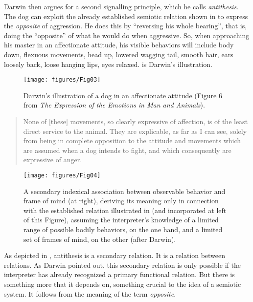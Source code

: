 Darwin then argues for a second signalling principle, which he calls \textit{antithesis}. The dog can exploit the already established semiotic 
relation shown in  to express the \textit{opposite} 
of aggression. He does this by ``reversing his whole bearing'', that is, doing the 
``opposite'' of what he would do when aggressive. So, when approaching 
his master in an affectionate attitude, his visible behaviors will include body 
down, flexuous movements, head up, lowered wagging tail, smooth hair, 
ears loosely back, loose hanging lips, eyes relaxed.  is 
Darwin's illustration.


\begin{figure}[h]
\texttt{[image: figures/Fig03]}
\caption{Darwin's illustration of a dog in an affectionate attitude 
(Figure 6 from \textit{The Expression of the Emotions in Man and 
Animals}).}
\label{darwin2}
\end{figure}




\begin{quotation}
None of $[$these$]$ movements, so clearly expressive of 
affection, is of the least direct service to the animal. They are 
explicable, as far as I can see, solely from being in complete 
opposition to the attitude and movements which are assumed when a dog 
intends to fight, and which consequently are expressive of anger. 
\citep[15--16]{darwin_expression_1872} 
\end{quotation}


\begin{figure}[h]
\texttt{[image: figures/Fig04]}
\caption{A secondary indexical association between observable behavior 
and frame of mind (at right), deriving its meaning only in connection 
with the established relation illustrated in  (and incorporated 
at left of this Figure), assuming the interpreter's knowledge of a 
limited range of possible bodily behaviors, on the one hand, and a 
limited set of frames of mind, on the other (after Darwin).}
\label{secondaryassoc}
\end{figure}

As depicted in , antithesis is a secondary relation. It is a relation between relations. As Darwin 
pointed out, this secondary relation is only possible if the interpreter has already recognized a primary functional relation. But there is something 
more that it depends on, something crucial to the idea of a semiotic 
system. It follows from the meaning of the term \textit{opposite}. 



